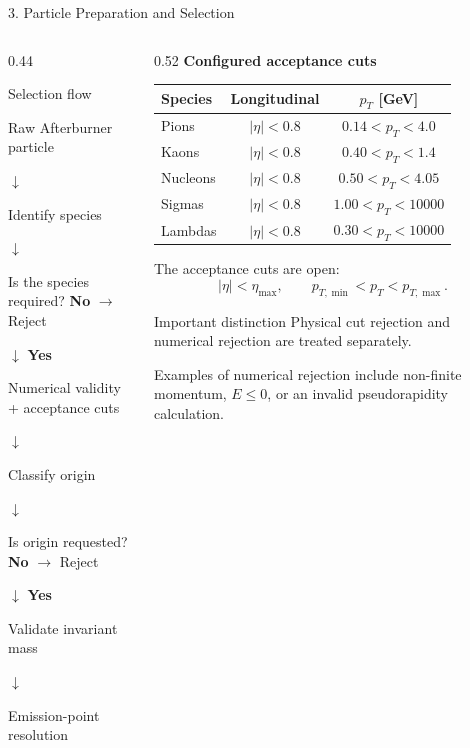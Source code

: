 \documentclass{beamer}
\begin{document}
\begin{frame}{3. Particle Preparation and Selection}
\scriptsize

\begin{columns}[T]

\begin{column}{0.44\textwidth}
\begin{block}{Selection flow}
\begin{center}
Raw Afterburner particle

$\downarrow$

Identify species

$\downarrow$

Is the species required? \hfill \textbf{No} $\rightarrow$ Reject

$\downarrow$ \textbf{Yes}

Numerical validity + acceptance cuts

$\downarrow$

Classify origin

$\downarrow$

Is origin requested? \hfill \textbf{No} $\rightarrow$ Reject

$\downarrow$ \textbf{Yes}

Validate invariant mass

$\downarrow$

Emission-point resolution
\end{center}
\end{block}
\end{column}

\begin{column}{0.52\textwidth}
\textbf{Configured acceptance cuts}

\medskip
{\fontsize{6.5}{7.2}\selectfont
\begin{tabular}{lcc}
\textbf{Species} & \textbf{Longitudinal} & \textbf{$p_T$ [GeV]} \\
\hline
Pions     & $|\eta|<0.8$ & $0.14<p_T<4.0$ \\
Kaons     & $|\eta|<0.8$ & $0.40<p_T<1.4$ \\
Nucleons  & $|\eta|<0.8$ & $0.50<p_T<4.05$ \\
Sigmas    & $|\eta|<0.8$ & $1.00<p_T<10000$ \\
Lambdas   & $|\eta|<0.8$ & $0.30<p_T<10000$ \\
\end{tabular}}

\medskip
The acceptance cuts are open:
\[
|\eta|<\eta_{\max},
\qquad
p_{T,\min}<p_T<p_{T,\max}.
\]

\begin{alertblock}{Important distinction}
Physical cut rejection and numerical rejection are treated separately.
\end{alertblock}

Examples of numerical rejection include non-finite momentum, $E\leq0$, or an invalid pseudorapidity calculation.
\end{column}

\end{columns}

\end{frame}
\end{document}
